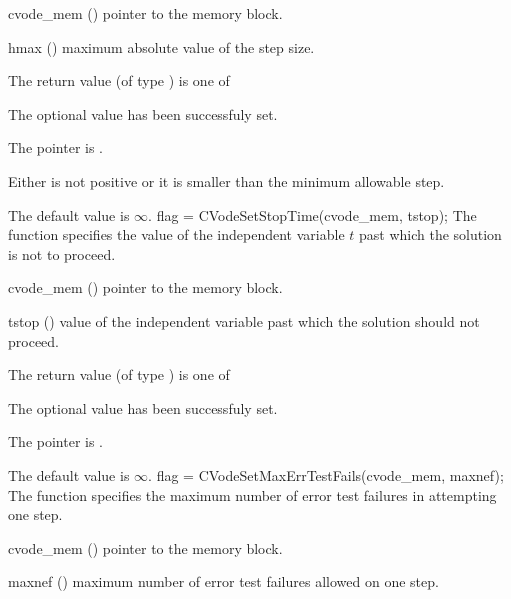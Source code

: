 {
  \begin{args}
  \item[cvode\_mem] ()
    pointer to the {\cvode} memory block.
  \item[hmax] ()
    maximum absolute value of the step size.
  \end{args}
}
{
  The return value  (of type ) is one of
  \begin{args}
  \item[\Id{SUCCESS}] 
    The optional value has been successfuly set.
  \item[\Id{CVS\_NO\_MEM}]
    The  pointer is .
  \item[\Id{CVS\_ILL\_INPUT}]
    Either  is not positive or it is smaller than the minimum allowable step.
  \end{args}
}
{
  The default value is $\infty$.
}
{
flag = CVodeSetStopTime(cvode\_mem, tstop);
}
{
  The function  specifies the value of the
  independent variable $t$ past which the solution is not to proceed.
}
{
  \begin{args}
  \item[cvode\_mem] ()
    pointer to the {\cvode} memory block.
  \item[tstop] ()
    value of the independent variable past which the solution should
    not proceed.
  \end{args}
}
{
  The return value  (of type ) is one of
  \begin{args}
  \item[\Id{SUCCESS}] 
    The optional value has been successfuly set.
  \item[\Id{CVS\_NO\_MEM}]
    The  pointer is .
  \end{args}
}
{
  The default value is $\infty$.
}
{
flag = CVodeSetMaxErrTestFails(cvode\_mem, maxnef);
}
{
  The function  specifies the
  maximum number of error test failures in attempting one step.
}
{
  \begin{args}
  \item[cvode\_mem] ()
    pointer to the {\cvode} memory block.
  \item[maxnef] ()
    maximum number of error test failures allowed on one step.
  \end{args}
}
